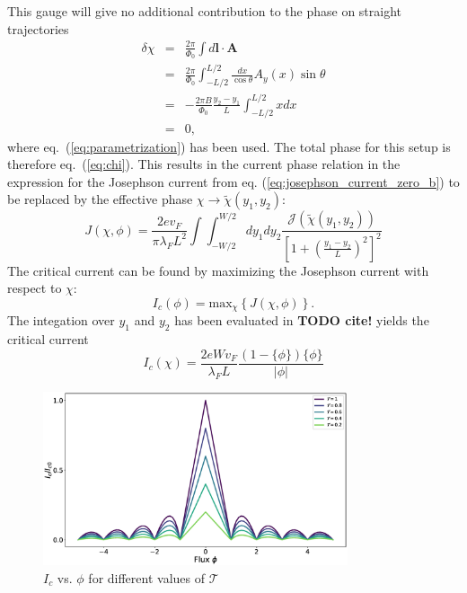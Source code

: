 This gauge will give no additional contribution to the phase on straight trajectories
\begin{eqnarray}
\delta \chi &=& \frac{2 \pi}{\Phi_0} \int d \mathbf{l} \cdot \mathbf{A} \\
&=& \frac{2 \pi}{\Phi_0} \int_{-L/2}^{L/2} \frac{dx}{\cos \theta} A_y (x) \sin \theta \\
&=& - \frac{2 \pi B}{\Phi_0} \frac{y_2 - y_1}{L} \int_{-L/2}^{L/2} x dx \\
&=& 0, \label{eq:magnetic-phase-straight}
\end{eqnarray}
where eq.~(\ref{eq:parametrization}) has been used. The total phase for this setup is therefore eq.~(\ref{eq:chi}). This results in the current phase relation in the expression for the Josephson current from eq. (\ref{eq:josephson_current_zero_b}) to be replaced by the effective phase $\chi \rightarrow \tilde{\chi}(y_1, y_2)$:
\begin{equation}
J\left(\chi, \phi \right) = \frac{2 e v_F}{\pi \lambda_F L^2}  \int \int_{-W/2}^{W/2} d y_1 d y_2 \frac{\mathcal{J}(\tilde{\chi}(y_1, y_2))}{\left[ 1 + \left(\frac{y_1 - y_2}{L}\right)^2\right]^2}
\label{eq:josephson_current}
\end{equation}
The critical current can be found by maximizing the Josephson current with respect to $\chi$:
\begin{equation}
I_c(\phi) = \text{max}_{\chi}\left\{ J(\chi, \phi) \right\}.
\end{equation}
The integation over $y_1$ and $y_2$ has been evaluated in \textbf{TODO cite!} yields the critical current
\begin{equation}
I_c(\chi) = \frac{2e W v_F }{\lambda_F L}\frac{( 1- \{ \phi \}) \{ \phi \} }{|\phi|} 
\end{equation}

\begin{figure}
\centering
\includegraphics[width=0.8\textwidth]{figure/analyticalmodel/ic_vs_tau}
\caption{$I_c$ vs. $\phi$ for different values of  $\mathcal{T}$}
\end{figure}

